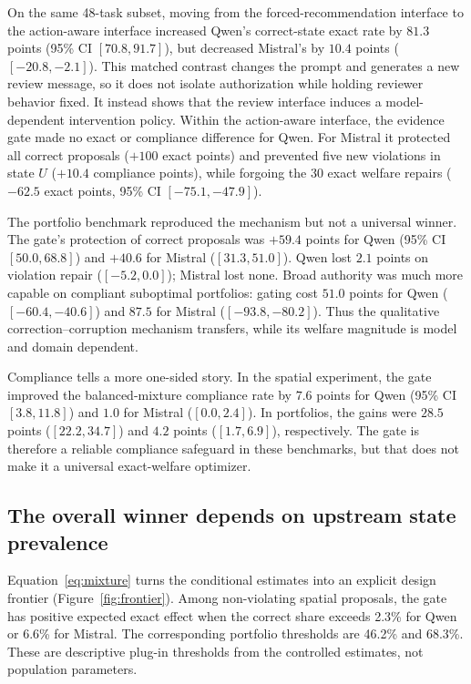 \documentclass[10pt]{article}
\begin{document}
On the same 48-task subset, moving from the forced-recommendation interface to
the action-aware interface increased Qwen's correct-state exact rate by $81.3$
points (95\% CI $[70.8,91.7]$), but decreased Mistral's by $10.4$ points
($[-20.8,-2.1]$). This matched contrast changes the prompt and generates a new
review message, so it does not isolate authorization while holding reviewer
behavior fixed. It instead shows that the review interface induces a
model-dependent intervention policy. Within the action-aware interface, the
evidence gate made no exact or compliance difference for Qwen. For Mistral it
protected all correct proposals ($+100$ exact points) and prevented five new
violations in state $U$ ($+10.4$ compliance points), while forgoing the 30 exact
welfare repairs ($-62.5$ exact points, 95\% CI $[-75.1,-47.9]$).

The portfolio benchmark reproduced the mechanism but not a universal winner.
The gate's protection of correct proposals was $+59.4$ points for Qwen (95\%
CI $[50.0,68.8]$) and $+40.6$ for Mistral ($[31.3,51.0]$). Qwen lost $2.1$
points on violation repair ($[-5.2,0.0]$); Mistral lost none. Broad authority was
much more capable on compliant suboptimal portfolios: gating cost $51.0$ points
for Qwen ($[-60.4,-40.6]$) and $87.5$ for Mistral
($[-93.8,-80.2]$). Thus the qualitative correction--corruption mechanism
transfers, while its welfare magnitude is model and domain dependent.

Compliance tells a more one-sided story. In the spatial experiment, the gate
improved the balanced-mixture compliance rate by $7.6$ points for Qwen (95\% CI
$[3.8,11.8]$) and $1.0$ for Mistral ($[0.0,2.4]$). In portfolios, the gains were
$28.5$ points ($[22.2,34.7]$) and $4.2$ points ($[1.7,6.9]$), respectively. The
gate is therefore a reliable compliance safeguard in these benchmarks, but that
does not make it a universal exact-welfare optimizer.

\subsection{The overall winner depends on upstream state prevalence}

Equation~\ref{eq:mixture} turns the conditional estimates into an explicit
design frontier (Figure~\ref{fig:frontier}). Among non-violating spatial
proposals, the gate has positive expected exact effect when the correct share
exceeds 2.3\% for Qwen or 6.6\% for Mistral. The corresponding portfolio
thresholds are 46.2\% and 68.3\%. These are descriptive plug-in thresholds from
the controlled estimates, not population parameters.
\end{document}
